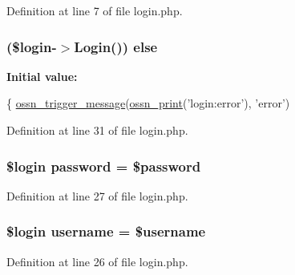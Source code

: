 Definition at line 7 of file login.\+php.

\subsubsection[{\texorpdfstring{else}{else}}]{ (\$login-\/$>$Login()) else}\hypertarget{actions_2administrator_2login_8php_a514c4a3dcf615a7dd4fc6a15e5d1761b}{}\label{actions_2administrator_2login_8php_a514c4a3dcf615a7dd4fc6a15e5d1761b}
{\bfseries Initial value\+:}
\begin{DoxyCode}
\{
    \hyperlink{ossn_8lib_8system_8php_ab3f23f23f32f50c12e7aea0ffaccaac7}{ossn\_trigger\_message}(\hyperlink{ossn_8lib_8languages_8php_a2be5d1c4b695593a9b9067b96df2150a}{ossn\_print}(\textcolor{stringliteral}{'login:error'}), \textcolor{stringliteral}{'error'})
\end{DoxyCode}


Definition at line 31 of file login.\+php.

\subsubsection[{\texorpdfstring{password}{password}}]{\setlength{\rightskip}{0pt plus 5cm}\$login password = \$password}\hypertarget{actions_2administrator_2login_8php_a04cab294daa984a97618ae9c32c2e8e8}{}\label{actions_2administrator_2login_8php_a04cab294daa984a97618ae9c32c2e8e8}


Definition at line 27 of file login.\+php.

\subsubsection[{\texorpdfstring{username}{username}}]{\setlength{\rightskip}{0pt plus 5cm}\$login username = \$username}\hypertarget{actions_2administrator_2login_8php_a5ae6e9dd2f76961089b9aa789ef054f5}{}\label{actions_2administrator_2login_8php_a5ae6e9dd2f76961089b9aa789ef054f5}


Definition at line 26 of file login.\+php.

